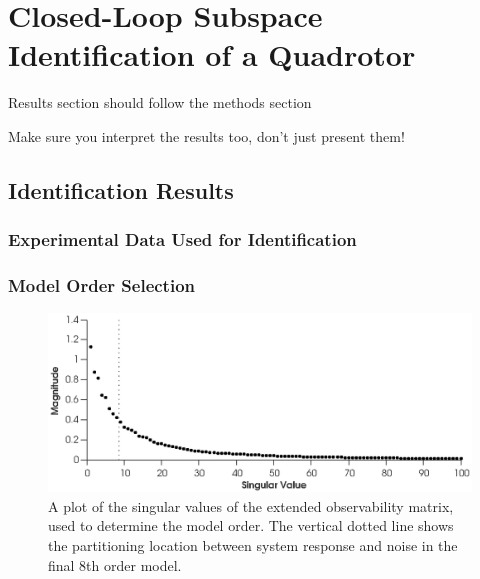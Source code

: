 \chapter{Closed-Loop Subspace Identification of a Quadrotor}\label{results}

Results section should follow the methods section

Make sure you interpret the results too, don't just present them!

\section{Identification Results}



\subsection{Experimental Data Used for Identification}




\subsection{Model Order Selection}
\begin{figure}[htb!]\label{fig:5_singular_values}
	\centering
	\includegraphics{../fig/singular_values_parsim.eps}
	\caption{A plot of the singular values of the extended observability matrix, used to determine the model order. The vertical dotted line shows the partitioning location between system response and noise in the final 8th order model.}
\end{figure}



